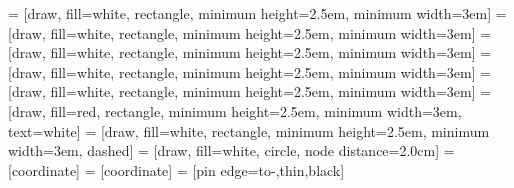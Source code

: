  = [draw, fill=white, rectangle, minimum height=2.5em, minimum width=3em]
 = [draw, fill=white, rectangle, minimum height=2.5em, minimum width=3em]
 = [draw, fill=white, rectangle, minimum height=2.5em, minimum width=3em]
 = [draw, fill=white, rectangle, minimum height=2.5em, minimum width=3em]
 = [draw, fill=white, rectangle, minimum height=2.5em, minimum width=3em]
 = [draw, fill=red, rectangle, minimum height=2.5em, minimum width=3em, text=white]
 = [draw, fill=white, rectangle, minimum height=2.5em, minimum width=3em, dashed]
 = [draw, fill=white, circle, node distance=2.0cm]
 = [coordinate]
 = [coordinate]
 = [pin edge={to-,thin,black}]

\usetikzlibrary{positioning}
\makeatletter
{}
\makeatother

